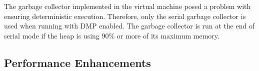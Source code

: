 The garbage collector implemented in the virtual machine posed a
problem with ensuring deterministic execution.  Therefore, only the
serial garbage collector is used when running with DMP enabled.  The
garbage collector is run at the end of serial mode if the heap is
using $90\%$ or more of its maximum memory.

\subsection{Performance Enhancements}

%
% 
% 

